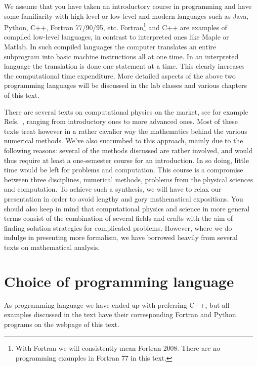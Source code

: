 We assume that you
have taken an introductory course in programming 
and have some familiarity with high-level or low-level and modern
languages such as Java, Python, 
C++, Fortran 77/90/95, etc. 
Fortran\footnote{With Fortran we will consistently mean Fortran 2008. 
There are no programming examples in Fortran 77 in this text.} 
and C++ are examples of compiled low-level languages,
in contrast to interpreted ones like Maple or Matlab. In such compiled languages the
computer translates an entire subprogram into basic machine instructions
all at one time. In an interpreted language the translation is done 
one statement at a time. This clearly increases the computational
time expenditure.
More detailed aspects of the above two programming 
languages will be discussed in the lab classes and various chapters of this text.

There are several texts on computational physics on the 
market, see for 
example Refs.~\cite{thij,km90,gibbs1994,giordano2005,landau,guardiola,fritz,gould1996}, 
ranging from
introductory ones to more advanced ones. Most of these texts treat however in 
a rather cavalier way the mathematics behind the various numerical methods. 
We've also succumbed to this approach, mainly due to the following reasons:
several of the methods discussed are rather involved, and would thus require
at least a one-semester course for an introduction. 
In so doing, little time would be left
for problems and computation. This course is  a compromise between three disciplines,
numerical methods, problems from the physical sciences and computation. To achieve such a synthesis, we will have 
to relax our presentation in order to avoid lengthy  and gory mathematical
expositions. You should also keep in mind that
computational physics and science in more general terms consist 
of the combination of several fields
and crafts with the aim of finding solution strategies for complicated problems. 
However, where we do indulge in presenting more formalism, we have 
borrowed heavily from several texts on mathematical analysis.

\section{Choice of programming language}

As programming language we have ended up with preferring 
C++, but all examples discussed in the text have their 
corresponding Fortran and Python programs on the webpage of this text.
 
